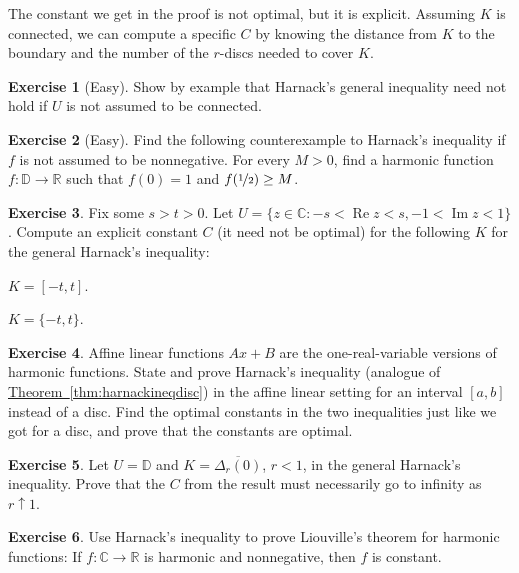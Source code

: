 \documentclass[12pt,openany]{book}
\newcommand{\tab}{\qquad}
\renewcommand{\Re}{\operatorname{Re}}
\renewcommand{\Im}{\operatorname{Im}}
\newcommand{\C}{{\mathbb{C}}}
\newcommand{\R}{{\mathbb{R}}}
\newcommand{\D}{{\mathbb{D}}}
\theoremstyle{plain}
\theoremstyle{remark}
\theoremstyle{definition}
\newenvironment{exbox}{%
    \def\FrameCommand{\vrule width 1pt \relax\hspace{10pt}}%
    \MakeFramed{\advance\hsize-\width\FrameRestore}%
}{%
    \endMakeFramed
}
\newenvironment{expartshor}[1]{%
    \begingroup%
    \NumTabs{#1}%
    \leavevmode%
    \par%
    \begin{enumerate*}[a),itemjoin={\tab}]
}{%
    \end{enumerate*}\endgroup\par
}
\theoremstyle{exercise}
\newtheorem{exercise}{Exercise}[section]
\theoremstyle{example}
\newcommand{\thmref}[1]{\hyperref[#1]{Theorem~\ref*{#1}}}
\begin{document}
The constant we get in the proof is not optimal, but it is explicit.
Assuming $K$ is connected,
we can compute a specific $C$ by knowing the distance from $K$
to the boundary and the number of the $r$-discs needed to cover $K$.

\begin{exbox}
\begin{exercise}[Easy]
Show by example that Harnack's general inequality need not hold if $U$
is not assumed to be connected.
\end{exercise}

\begin{exercise}[Easy]
Find the following counterexample to Harnack's inequality
if $f$ is not assumed to be
nonnegative.  For every $M > 0$, find
a harmonic function $f \colon \D \to \R$ such that $f(0) = 1$ and
$f(\nicefrac{1}{2}) \geq M$.
\end{exercise}

\begin{exercise}
Fix some $s > t > 0$.
Let $U = \{z \in \C : -s < \Re z < s, -1 < \Im z < 1 \}$.
Compute an explicit constant $C$
(it need not be optimal)
for the following $K$ for the general
Harnack's inequality:
\smallskip
\begin{expartshor}{2}
\item
$K = [-t,t]$.
\item
$K = \{-t,t\}$.
\end{expartshor}
\end{exercise}

\begin{exercise}
Affine linear functions $Ax+B$ are the one-real-variable
versions of harmonic functions.  State and prove Harnack's inequality
(analogue of \thmref{thm:harnackineqdisc})
in the affine linear setting for an interval $[a,b]$ instead of a disc.
Find the optimal constants in the two inequalities just like we got for a disc,
and prove that the constants are optimal.
\end{exercise}

\begin{exercise}
Let $U = \D$ and $K=\overline{\Delta_r(0)}$, $r < 1$, in the general 
Harnack's inequality.  Prove that the $C$ from the result
must necessarily go to infinity as $r \uparrow 1$.
\end{exercise}

\begin{exercise}
Use Harnack's inequality to prove Liouville's theorem
for harmonic functions:
If $f \colon \C \to \R$ is harmonic
and nonnegative, then $f$ is constant.
\end{exercise}
\end{exbox}
\end{document}
